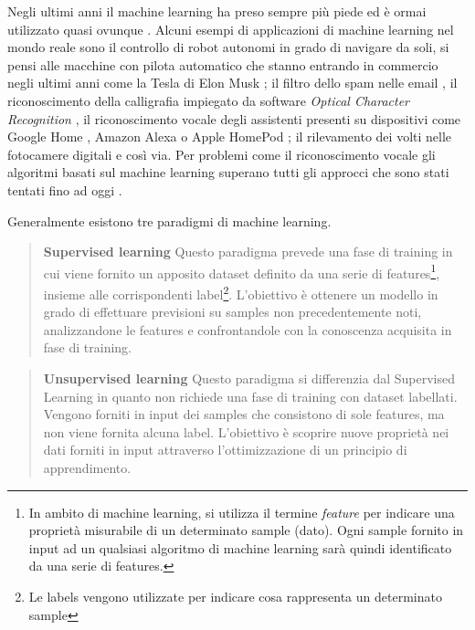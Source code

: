 \documentclass[../main.tex]{subfiles}
\begin{document}
Negli ultimi anni il machine learning ha preso sempre più piede ed è ormai utilizzato quasi ovunque \cite{compIntelligence}. Alcuni esempi di applicazioni di machine learning nel mondo reale sono il controllo di robot autonomi in grado di navigare da soli, si pensi alle macchine con pilota automatico che stanno entrando in commercio negli ultimi anni come la Tesla di Elon Musk \cite{tesla}; il filtro dello spam nelle email \cite{spamemail}, il riconoscimento della calligrafia impiegato da software \textit{Optical Character Recognition} \cite{ocr}, il riconoscimento vocale degli assistenti presenti su dispositivi come Google Home \cite{googlehome}, Amazon Alexa \cite{amazonalexa} o Apple HomePod \cite{applehomepod}; il rilevamento dei volti nelle fotocamere digitali \cite{facialrecognition} e così via.
Per problemi come il riconoscimento vocale gli algoritmi basati sul machine learning superano tutti gli approcci che sono stati tentati fino ad oggi \cite{mldef}.


Generalmente esistono tre paradigmi di machine learning\cite{ai}.
\begin{verse}
				\textbf{Supervised learning} Questo paradigma prevede una fase di training in cui viene fornito un apposito dataset definito da una serie di features\footnote{In ambito di machine learning, si utilizza il termine \textit{feature} per indicare una proprietà misurabile di un determinato sample (dato). Ogni sample fornito in input ad un qualsiasi algoritmo di machine learning sarà quindi identificato da una serie di features.}, insieme alle corrispondenti label\footnote{Le labels vengono utilizzate per indicare cosa rappresenta un determinato sample}. L'obiettivo è ottenere un modello in grado di effettuare previsioni su samples non precedentemente noti, analizzandone le features e confrontandole con la conoscenza acquisita in fase di training.
\end{verse}

\begin{verse}
				\textbf{Unsupervised learning} Questo paradigma si differenzia dal Supervised Learning in quanto non richiede una fase di training con dataset labellati. Vengono forniti in input dei samples che consistono di sole features, ma non viene fornita alcuna label. L'obiettivo è scoprire nuove proprietà nei dati forniti in input attraverso l'ottimizzazione di un principio di apprendimento.
\end{verse}
\end{document}
